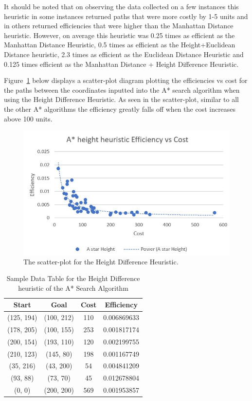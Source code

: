 \documentclass[11pt,oneside]{article}
\begin{document}
It should be noted that on observing the data collected on a few instances this heuristic in some instances returned paths that were more costly by 1-5 units and in others returned efficiencies that were higher than the Manhattan Distance heuristic. However, on average this heuristic was 0.25 times as efficient as the Manhattan Distance Heuristic, 0.5 times as efficient as the Height+Euclidean Distance heuristic, 2.3 times as efficient as the Euclidean Distance Heuristic and 0.125 times efficient as the Manhattan Distance + Height Difference Heuristic.

Figure~\ref{fig:HDEvC} below displays a scatter-plot diagram plotting the efficiencies vs cost for the paths between the coordinates inputted into the A* search algorithm when using the Height Difference Heuristic. As seen in the scatter-plot, similar to all the other A* algorithms the efficiency greatly falls off when the cost increases above 100 units.

\begin{figure}[H]
    \centering
      \includegraphics[scale=0.8]{HD efficiency vs cost.JPG}
      \caption{The scatter-plot for the Height Difference Heuristic.}
      \label{fig:HDEvC}
    \end{figure} 
    
    \begin{table}[H]
    \centering
    \begin{tabular}{|c|c|c|c|}
        Start        & Goal       & Cost & Efficiency \\ \hline
        (125, 194)   & (100, 212) & 110 & 0.006869633 \\
        (178, 205)   & (100, 155) & 253 & 0.001817174 \\
        (200, 154)   & (193, 110) & 120 & 0.002199755 \\
        (210, 123)   & (145, 80)  & 198 & 0.001167749 \\
        (35, 216)    & (43, 200)  & 54 & 0.004841209 \\
        (93, 88)     & (73, 70)   & 45 & 0.012678804 \\
        (0, 0)       & (200, 200) & 569 & 0.001953857 \\
    \end{tabular}
    \caption{Sample Data Table for the Height Difference heuristic of the A* Search Algorithm}
    \label{tab:my_label}
\end{table}
\end{document}
